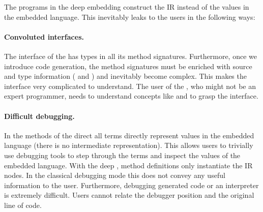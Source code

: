 The programs in the deep embedding construct the IR instead of the values in the embedded language. This inevitably leaks to the users in the following ways:

\paragraph{Convoluted interfaces.} The interface of the \edsl has 
types in all its method signatures. Furthermore, once we introduce code
generation, the method signatures must be enriched with source and type
information ( and ) and inevitably become
complex. This makes the interface very complicated to understand. The user of
the \edsl{}, who might not be an expert programmer, needs to understand concepts
like  and  to grasp the interface.


\paragraph{Difficult debugging.} In the methods of the direct \edsl{} all terms
directly represent values in the embedded language (there is no intermediate
representation). This allows users to trivially use debugging tools to step
through the terms and inspect the values of the embedded language. With the deep
\edsl{}, method definitions only instantiate the IR nodes. In the classical
debugging mode this does not convey any useful information to the user.
Furthermore, debugging generated code or an interpreter is extremely difficult.
Users cannot relate the debugger position and the original line of code.

